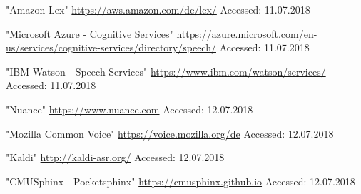 \documentclass[journal]{IEEEtran}
\begin{document}
\begin{thebibliography}{1}
"Amazon Lex"
\url{https://aws.amazon.com/de/lex/}
Accessed: 11.07.2018

"Microsoft Azure - Cognitive Services"
\url{https://azure.microsoft.com/en-us/services/cognitive-services/directory/speech/}
Accessed: 11.07.2018

"IBM Watson - Speech Services"
\url{https://www.ibm.com/watson/services/}
Accessed: 11.07.2018

"Nuance"
\url{https://www.nuance.com}
Accessed: 12.07.2018

"Mozilla Common Voice"
\url{https://voice.mozilla.org/de}
Accessed: 12.07.2018

"Kaldi"
\url{http://kaldi-asr.org/}
Accessed: 12.07.2018

"CMUSphinx - Pocketsphinx"
\url{https://cmusphinx.github.io}
Accessed: 12.07.2018
\end{thebibliography}
\end{document}
